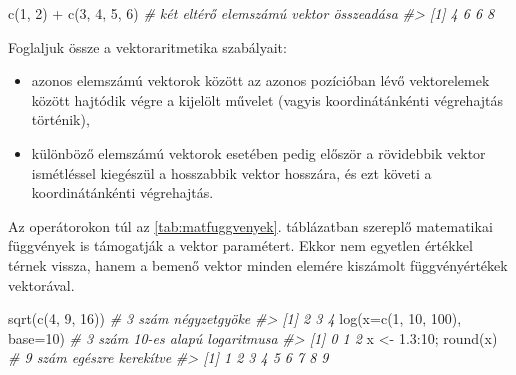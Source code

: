 \documentclass[
]{book}
\newenvironment{Shaded}{\begin{snugshade}}{\end{snugshade}}
\newcommand{\AttributeTok}[1]{\textcolor[rgb]{0.77,0.63,0.00}{#1}}
\newcommand{\CommentTok}[1]{\textcolor[rgb]{0.56,0.35,0.01}{\textit{#1}}}
\newcommand{\DecValTok}[1]{\textcolor[rgb]{0.00,0.00,0.81}{#1}}
\newcommand{\FloatTok}[1]{\textcolor[rgb]{0.00,0.00,0.81}{#1}}
\newcommand{\FunctionTok}[1]{\textcolor[rgb]{0.00,0.00,0.00}{#1}}
\newcommand{\NormalTok}[1]{#1}
\newcommand{\OtherTok}[1]{\textcolor[rgb]{0.56,0.35,0.01}{#1}}
\newcommand{\SpecialCharTok}[1]{\textcolor[rgb]{0.00,0.00,0.00}{#1}}
\providecommand{\tightlist}{%
  \setlength{\itemsep}{0pt}\setlength{\parskip}{0pt}}
\begin{document}
\begin{Shaded}
\begin{Highlighting}[]
\FunctionTok{c}\NormalTok{(}\DecValTok{1}\NormalTok{, }\DecValTok{2}\NormalTok{) }\SpecialCharTok{+} \FunctionTok{c}\NormalTok{(}\DecValTok{3}\NormalTok{, }\DecValTok{4}\NormalTok{, }\DecValTok{5}\NormalTok{, }\DecValTok{6}\NormalTok{)  }\CommentTok{\# két eltérő elemszámú vektor összeadása }
\CommentTok{\#\textgreater{} [1] 4 6 6 8}
\end{Highlighting}
\end{Shaded}

Foglaljuk össze a vektoraritmetika szabályait:

\begin{itemize}
\tightlist
\item
  azonos elemszámú vektorok között az azonos pozícióban lévő vektorelemek között hajtódik végre a kijelölt művelet (vagyis koordinátánkénti végrehajtás történik),
\item
  különböző elemszámú vektorok esetében pedig először a rövidebbik vektor ismétléssel kiegészül a hosszabbik vektor hosszára, és ezt követi a koordinátánkénti végrehajtás.
\end{itemize}

Az operátorokon túl az \ref{tab:matfuggvenyek}. táblázatban szereplő matematikai függvények is támogatják a vektor paramétert. Ekkor nem egyetlen értékkel térnek vissza, hanem a bemenő vektor minden elemére kiszámolt függvényértékek vektorával.

\begin{Shaded}
\begin{Highlighting}[]
\FunctionTok{sqrt}\NormalTok{(}\FunctionTok{c}\NormalTok{(}\DecValTok{4}\NormalTok{, }\DecValTok{9}\NormalTok{, }\DecValTok{16}\NormalTok{))              }\CommentTok{\# 3 szám négyzetgyöke}
\CommentTok{\#\textgreater{} [1] 2 3 4}
\FunctionTok{log}\NormalTok{(}\AttributeTok{x=}\FunctionTok{c}\NormalTok{(}\DecValTok{1}\NormalTok{, }\DecValTok{10}\NormalTok{, }\DecValTok{100}\NormalTok{), }\AttributeTok{base=}\DecValTok{10}\NormalTok{)  }\CommentTok{\# 3 szám 10{-}es alapú logaritmusa}
\CommentTok{\#\textgreater{} [1] 0 1 2}
\NormalTok{x }\OtherTok{\textless{}{-}} \FloatTok{1.3}\SpecialCharTok{:}\DecValTok{10}\NormalTok{; }\FunctionTok{round}\NormalTok{(x)          }\CommentTok{\# 9 szám egészre kerekítve }
\CommentTok{\#\textgreater{} [1] 1 2 3 4 5 6 7 8 9}
\end{Highlighting}
\end{Shaded}
\end{document}
